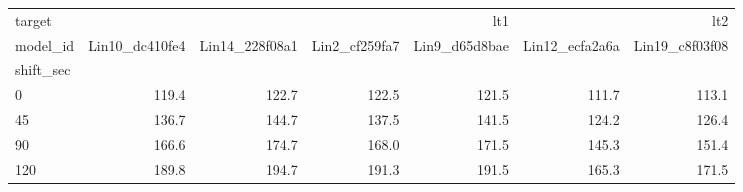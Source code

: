 \begin{tabular}{lrrrrrr}
\toprule
target & \multicolumn{4}{r}{lt1} & \multicolumn{2}{r}{lt2} \\
model_id & Lin10_dc410fe4 & Lin14_228f08a1 & Lin2_cf259fa7 & Lin9_d65d8bae & Lin12_ecfa2a6a & Lin19_c8f03f08 \\
shift_sec &  &  &  &  &  &  \\
\midrule
0 & 119.4 & 122.7 & 122.5 & 121.5 & 111.7 & 113.1 \\
45 & 136.7 & 144.7 & 137.5 & 141.5 & 124.2 & 126.4 \\
90 & 166.6 & 174.7 & 168.0 & 171.5 & 145.3 & 151.4 \\
120 & 189.8 & 194.7 & 191.3 & 191.5 & 165.3 & 171.5 \\
\bottomrule
\end{tabular}
